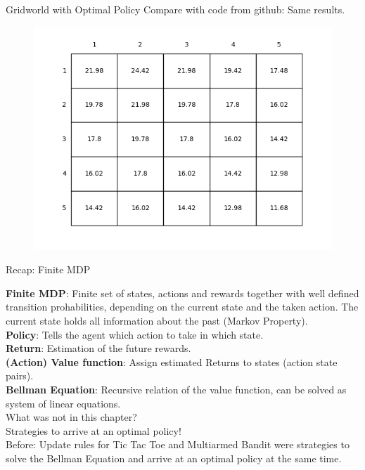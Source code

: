 \documentclass{beamer}
\begin{document}
\begin{frame}{Gridworld with Optimal Policy}
	Compare with code from github: Same results.
	\begin{figure}
	\centering
	\includegraphics[width=0.8\linewidth]{Images/figure_3_5.png}\\	
	\end{figure}	
\end{frame}

\begin{frame}{Recap: Finite MDP}

\textbf{Finite MDP}: Finite set of states, actions and rewards together with well defined transition prohabilities, depending on the current state and the taken action. The current state holds all information about the past (Markov Property). \\
\textbf{Policy}: Tells the agent which action to take in which state. \\
\textbf{Return}: Estimation of the future rewards. \\
\textbf{(Action) Value function}: Assign estimated Returns to states (action state pairs). \\
\textbf{Bellman Equation}: Recursive relation of the value function, can be solved as system of linear equations. \\
\vspace{0.3cm}
What was not in this chapter? \\
Strategies to arrive at an optimal policy!\\
Before: Update rules for Tic Tac Toe and Multiarmed Bandit were strategies to solve the Bellman Equation and arrive at an optimal policy at the same time.

\end{frame}
\end{document}
